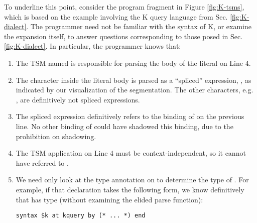 To underline this point, consider the program fragment in Figure \ref{fig:K-tsms}, which is based on the example involving the K query language from Sec. \ref{fig:K-dialect}. The programmer need not be familiar with the syntax of K, or examine the expansion itself, to answer questions corresponding to those posed in Sec. \ref{fig:K-dialect}. In particular, the programmer knows that:
\begin{enumerate}
\item The TSM named  is responsible for parsing the body of the literal on Line 4. 
\item The character  inside the literal body is parsed as a ``spliced'' expression, , as indicated by our visualization of the segmentation. The other characters, e.g. , are definitively not spliced expressions.
\item The spliced expression  definitively refers to the binding of  on the previous line. No other binding of  could have shadowed this binding, due to the prohibition on shadowing.
\item The TSM application on Line 4 must be context-independent, so it cannot have referred to .
\item We need only look at the type annotation on  to determine the type of . For example, if that declaration takes the following form, we know definitively that  has type  (without examining the elided parse function):
\begin{lstlisting}[numbers=none]
syntax $k at kquery by (* ... *) end
\end{lstlisting}
\end{enumerate}

\vspace{-3px}
